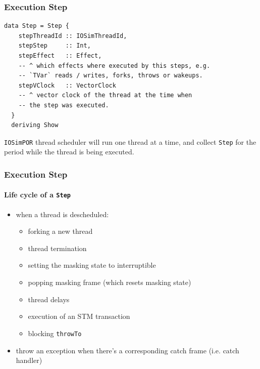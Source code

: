 \documentclass[t,x11names,xcolor={x11names},hyperref={colorlinks,citecolor=Blue4,linkcolor=Blue4,anchorcolor=Blue4,urlcolor=Blue4}]{beamer}
\begin{document}
\begin{frame}[fragile]
  \frametitle{Execution Step}
  \begin{verbatim}
data Step = Step {
    stepThreadId :: IOSimThreadId,
    stepStep     :: Int,
    stepEffect   :: Effect,
    -- ^ which effects where executed by this steps, e.g.
    -- `TVar` reads / writes, forks, throws or wakeups.
    stepVClock   :: VectorClock
    -- ^ vector clock of the thread at the time when
    -- the step was executed.
  }
  deriving Show
  \end{verbatim}

  \texttt{IOSimPOR} thread scheduler will run one thread at a time, and collect
  \texttt{Step} for the period while the thread is being executed.
\end{frame}

\begin{frame}
  \frametitle{Execution Step}
  \framesubtitle{Life cycle of a \texttt{Step}}
  \begin{itemize}
    \item when a thread is descheduled:
      \begin{itemize}
        \item forking a new thread
        \item thread termination
        \item setting the masking state to interruptible
        \item popping masking frame (which resets masking state)
        \item thread delays
        \item execution of an STM transaction
        \item blocking \texttt{throwTo}
      \end{itemize}
    \item throw an exception when there's a corresponding catch frame (i.e. catch handler)
  \end{itemize}
\end{frame}
\end{document}
